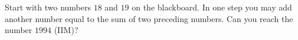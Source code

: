 Start with two numbers $18$ and $19$ on the blackboard. In one step you may add another number equal to the sum of two preceding numbers. Can you reach the number $1994$ (IIM)?
